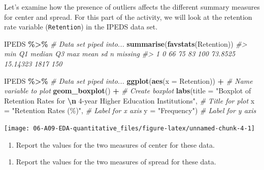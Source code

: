 \documentclass[
]{report}
\newenvironment{Shaded}{\begin{snugshade}}{\end{snugshade}}
\newcommand{\AttributeTok}[1]{\textcolor[rgb]{0.13,0.29,0.53}{#1}}
\newcommand{\CommentTok}[1]{\textcolor[rgb]{0.56,0.35,0.01}{\textit{#1}}}
\newcommand{\FunctionTok}[1]{\textcolor[rgb]{0.13,0.29,0.53}{\textbf{#1}}}
\newcommand{\NormalTok}[1]{#1}
\newcommand{\SpecialCharTok}[1]{\textcolor[rgb]{0.81,0.36,0.00}{\textbf{#1}}}
\newcommand{\StringTok}[1]{\textcolor[rgb]{0.31,0.60,0.02}{#1}}
\providecommand{\tightlist}{%
  \setlength{\itemsep}{0pt}\setlength{\parskip}{0pt}}
\begin{document}
Let's examine how the presence of outliers affects the different summary measures for center and spread. For this part of the activity, we will look at the retention rate variable (\texttt{Retention}) in the IPEDS data set.

\begin{Shaded}
\begin{Highlighting}[]
\NormalTok{IPEDS }\SpecialCharTok{\%\textgreater{}\%} \CommentTok{\# Data set piped into...}
    \FunctionTok{summarise}\NormalTok{(}\FunctionTok{favstats}\NormalTok{(Retention))}
\CommentTok{\#\textgreater{}   min Q1 median Q3 max    mean       sd    n missing}
\CommentTok{\#\textgreater{} 1   0 66     75 83 100 73.8525 15.14323 1817     150}

\NormalTok{IPEDS }\SpecialCharTok{\%\textgreater{}\%} \CommentTok{\# Data set piped into...}
    \FunctionTok{ggplot}\NormalTok{(}\FunctionTok{aes}\NormalTok{(}\AttributeTok{x =}\NormalTok{ Retention)) }\SpecialCharTok{+} \CommentTok{\# Name variable to plot}
    \FunctionTok{geom\_boxplot}\NormalTok{() }\SpecialCharTok{+} \CommentTok{\# Create boxplot }
    \FunctionTok{labs}\NormalTok{(}\AttributeTok{title =} \StringTok{"Boxplot of Retention Rates for }\SpecialCharTok{\textbackslash{}n}\StringTok{ 4{-}year Higher Education Institutions"}\NormalTok{,}
           \CommentTok{\# Title for plot}
         \AttributeTok{x =} \StringTok{"Retention Rates (\%)"}\NormalTok{, }\CommentTok{\# Label for x axis}
         \AttributeTok{y =} \StringTok{"Frequency"}\NormalTok{) }\CommentTok{\# Label for y axis}
\end{Highlighting}
\end{Shaded}

\begin{center}\texttt{[image: 06-A09-EDA-quantitative\_files/figure-latex/unnamed-chunk-4-1]} \end{center}

\begin{enumerate}
\def\labelenumi{\arabic{enumi}.}
\setcounter{enumi}{4}
\tightlist
\item
  Report the values for the two measures of center for these data.
\end{enumerate}

\vspace{0.5in}

\begin{enumerate}
\def\labelenumi{\arabic{enumi}.}
\setcounter{enumi}{5}
\tightlist
\item
  Report the values for the two measures of spread for these data.
\end{enumerate}
\end{document}
